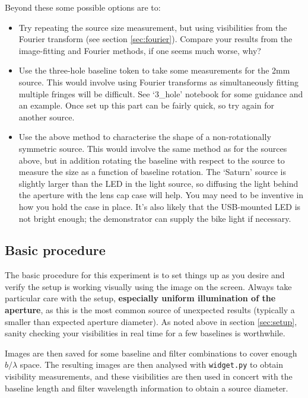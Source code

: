 \documentclass[11pt]{article}
\begin{document}
Beyond these some possible options are to:
\begin{itemize}
    \item Try repeating the source size measurement, but using visibilities from the Fourier transform (see section \ref{sec:fourier}). Compare your results from the image-fitting and Fourier methods, if one seems much worse, why?
    \item Use the three-hole baseline token to take some measurements for the 2mm source. This would involve using Fourier transforms as simultaneously fitting multiple fringes will be difficult. See `3\_hole' notebook for some guidance and an example. Once set up this part can be fairly quick, so try again for another source.
    \item Use the above method to characterise the shape of a non-rotationally symmetric source. This would involve the same method as for the sources above, but in addition rotating the baseline with respect to the source to measure the size as a function of baseline rotation. The `Saturn' source is slightly larger than the LED in the light source, so diffusing the light behind the aperture with the lens cap case will help. You may need to be inventive in how you hold the case in place. It's also likely that the USB-mounted LED is not bright enough; the demonstrator can supply the bike light if necessary.
\end{itemize}

\subsection{Basic procedure}

The basic procedure for this experiment is to set things up as you desire and verify the setup is working visually using the image on the screen. Always take particular care with the setup, \textbf{especially uniform illumination of the aperture}, as this is the most common source of unexpected results (typically a smaller than expected aperture diameter). As noted above in section \ref{sec:setup}, sanity checking your visibilities in real time for a few baselines is worthwhile.

Images are then saved for some baseline and filter combinations to cover enough $b/\lambda$ space. The resulting images are then analysed with \texttt{widget.py} to obtain visibility measurements, and these visibilities are then used in concert with the baseline length and filter wavelength information to obtain a source diameter.
\end{document}
